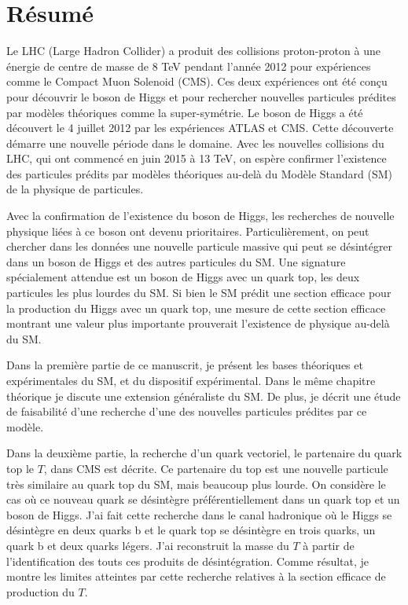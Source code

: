 \chapter*{R\'{e}sum\'{e}}

Le LHC (Large Hadron Collider) a produit des collisions proton-proton à une énergie de centre de masse de 8 TeV pendant l'année 2012 pour expériences comme le Compact Muon Solenoid (CMS). Ces deux expériences ont été conçu pour découvrir le boson de Higgs et pour rechercher nouvelles particules prédites par modèles théoriques comme la super-symétrie. Le boson de Higgs a été découvert le 4 juillet 2012 par les expériences ATLAS et CMS. Cette découverte démarre une nouvelle période dans le domaine. Avec les nouvelles collisions du LHC, qui ont commencé en juin 2015 à 13 TeV, on espère confirmer l’existence des particules prédits par modèles théoriques au-delà du Modèle Standard (SM) de la physique de particules.

Avec la confirmation de l'existence du boson de Higgs, les recherches de nouvelle physique liées à ce boson ont devenu prioritaires. Particulièrement, on peut chercher dans les données une nouvelle particule massive qui peut se désintégrer dans un boson de Higgs et des autres particules du SM. Une signature spécialement attendue est un boson de Higgs avec un quark top, les deux particules les plus lourdes du SM. Si bien le SM prédit une section efficace pour la production du Higgs avec un quark top, une mesure de cette section efficace montrant une valeur plus importante prouverait l'existence de physique au-delà du SM.

Dans la première partie de ce manuscrit, je présent les bases théoriques et expérimentales du SM, et du dispositif expérimental. Dans le même chapitre théorique je discute une extension généraliste du SM. De plus, je décrit une étude de faisabilité d'une recherche d'une des nouvelles particules prédites par ce modèle.

Dans la deuxième partie, la recherche d'un quark vectoriel, le partenaire du quark top le $T$, dans CMS est décrite. Ce partenaire du top est une nouvelle particule très similaire au quark top du SM, mais beaucoup plus lourde. On considère le cas où ce nouveau quark se désintègre préférentiellement dans un quark top et un boson de Higgs. J'ai fait cette recherche dans le canal hadronique où le Higgs se désintègre en deux quarks b et le quark top se désintègre en trois quarks, un quark b et deux quarks légers. J'ai reconstruit la masse du $T$ à partir de l'identification des touts ces produits de désintégration. Comme résultat, je montre les limites atteintes par cette recherche relatives à la section efficace de production du $T$. 
  

\endgroup